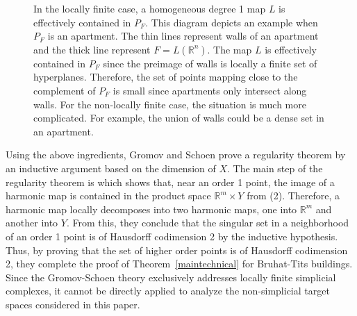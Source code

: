 \documentclass[12pt]{amsart}
\theoremstyle{definition}
\numberwithin{equation}{section}
\newcommand{\R}{\mathbb R}
\begin{document}
\begin{figure}[ht]
\centering

  \caption{In the locally finite case, a homogeneous degree 1  map $L$ is effectively contained in  $P_F$.  This diagram depicts an example when $P_F$ is an apartment.  The thin lines represent walls of an apartment and the thick line represent $F=L(\R^n)$. The map $L$ is effectively contained in $P_F$ since the preimage of walls is locally a finite set of hyperplanes. Therefore,  the set of points mapping close to the complement of $P_F$ is small since apartments only  intersect along walls.  For the non-locally finite case, the situation is much more complicated.  For example, the union of walls could be a dense set in an apartment.}
  \label{fig:phi1}
   \label{diagram:effective}
\end{figure}


Using the above ingredients, Gromov and Schoen prove a regularity theorem \cite[Thoerem 6.3]{gromov-schoen} by an inductive argument based on the dimension of $X$.   The main step of the regularity theorem is \cite[Theorem 5.1]{gromov-schoen} which shows that, near an order 1 point, the image of a  harmonic map  is contained in the product space $\R^m \times Y$ from (2). Therefore,  a harmonic map locally decomposes into two harmonic maps, one into $\R^m$ and another into $Y$.
From this, they conclude that  the singular set  in a  neighborhood of an order 1 point is of Hausdorff codimension 2 by the inductive hypothesis.  Thus, by proving that the set of higher order points is of Hausdorff codimension 2,  they complete the  proof of  Theorem~\ref{maintechnical} for Bruhat-Tits buildings.  
Since the Gromov-Schoen theory exclusively addresses locally finite simplicial complexes, it cannot be directly applied to analyze the non-simplicial target spaces considered in this paper. 
\end{document}

